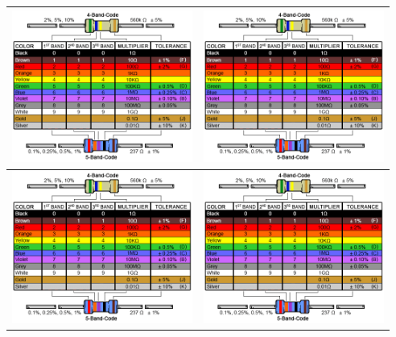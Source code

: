 \documentclass[oneside]{article}
\begin{document}
\begin{tabularx}{\linewidth}{| >{\centering\arraybackslash}X | >{\centering\arraybackslash}X |}
        \includegraphics[height=5cm]{Extras/resistor_chart} & \includegraphics[height=5cm]{Extras/resistor_chart}\\\hline
        \includegraphics[height=5cm]{Extras/resistor_chart} & \includegraphics[height=5cm]{Extras/resistor_chart}\\\hline

\end{tabularx}
\end{document}
